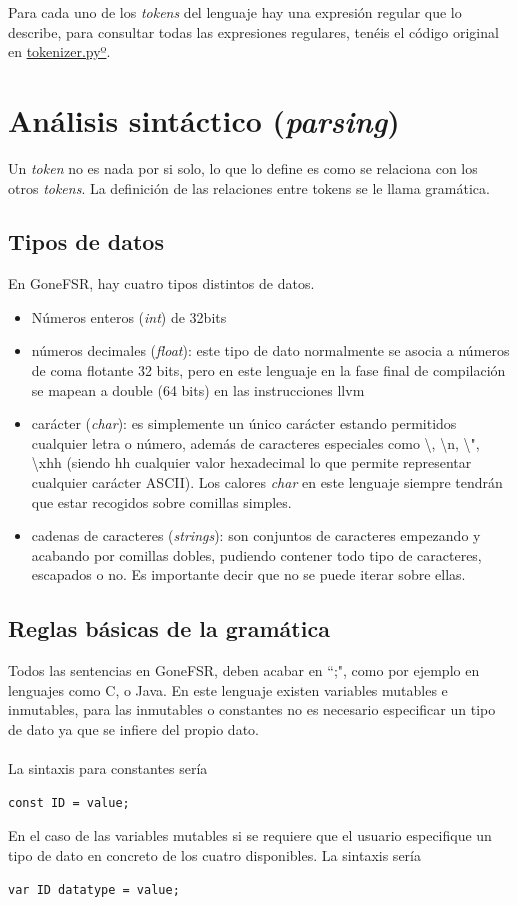 Para cada uno de los \textit{tokens} del lenguaje hay una expresión regular que lo describe, para consultar todas las expresiones regulares, tenéis el código original en \href{https://github.com/domingoUnican/TFGPedroCastro/blob/main/code/compilerGoneFSR/gone/tokenizer.py}{tokenizer.pyº}.


\newpage
\section{Análisis sintáctico (\textit{parsing})}
Un \textit{token} no es nada por si solo, lo que lo define es como se relaciona con los otros \textit{tokens}. La definición de las relaciones entre tokens se le llama gramática.
\subsection{Tipos de datos}
En GoneFSR, hay cuatro tipos distintos de datos. 
\begin{itemize}
    \item{Números enteros (\textit{int}) de 32bits}
    \item{números decimales (\textit{float}): este tipo de dato normalmente se asocia a números de coma flotante 32 bits, pero en este lenguaje en la fase final de compilación se mapean a double (64 bits) en las instrucciones llvm}
    \item{carácter (\textit{char}):  es simplemente un único carácter estando permitidos cualquier letra o número, además de caracteres especiales como \textbackslash, \textbackslash n, \textbackslash ", \textbackslash xhh (siendo hh cualquier valor hexadecimal lo que permite representar cualquier carácter ASCII). Los calores \textit{char} en este lenguaje siempre tendrán que estar recogidos sobre comillas simples.}
    \item{cadenas de caracteres (\textit{strings}): son conjuntos de caracteres empezando y acabando por comillas dobles, pudiendo contener todo tipo de caracteres, escapados o no. Es importante decir que no se puede iterar sobre ellas. }\\ 
\end{itemize}
\subsection{Reglas básicas de la gramática}
\label{reglas gramaticales 1}
Todos las sentencias en GoneFSR, deben acabar en ``;", como por ejemplo en lenguajes como C, o Java. En este lenguaje existen variables mutables e inmutables, para las inmutables o constantes no es necesario especificar un tipo de dato ya que se infiere del propio dato.\\\\
La sintaxis para constantes sería
\begin{lstlisting}[style=goneStyle]
const ID = value;
\end{lstlisting}
En el caso de las variables mutables si se requiere que el usuario especifique un tipo de dato en concreto de los cuatro disponibles. La sintaxis sería
\begin{lstlisting}[style=goneStyle]
var ID datatype = value;
\end{lstlisting}

